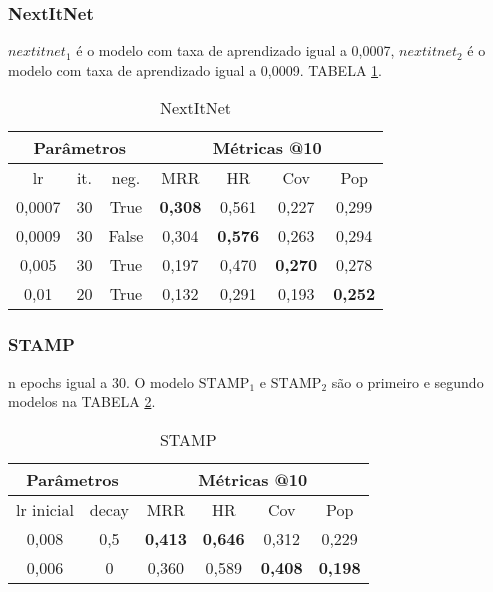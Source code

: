 \subsubsection{NextItNet}
$nextitnet_1$ é o modelo com taxa de aprendizado igual a 0,0007, $nextitnet_2$ é
o modelo com taxa de aprendizado igual a 0,0009. TABELA \ref{app:nextitnet2}.
\begin{table}
  \centering
  \begin{tabular}{|c|c|c|c|c|c|c|}
    \hline
      \multicolumn{3}{|c|}{Parâmetros} & \multicolumn{4}{c|}{Métricas @10} \\
      \hline
      lr & it. & neg. & MRR & HR & Cov & Pop \\
      \hline
      0,0007 & 30 & True & \textbf{0,308} & 0,561 & 0,227 & 0,299 \\
      \hline
      0,0009 & 30 & False & 0,304 & \textbf{0,576} & 0,263 & 0,294 \\
      \hline
      0,005 & 30 & True & 0,197 & 0,470 & \textbf{0,270} & 0,278 \\
      \hline
      0,01 & 20 & True & 0,132 & 0,291 & 0,193 & \textbf{0,252} \\
      \hline
    \end{tabular} \label{app:nextitnet2}
    \caption{NextItNet}
\end{table}

\subsubsection{STAMP}
n epochs igual a 30. O modelo $\text{STAMP}_{1}$ e $\text{STAMP}_{2}$
são o primeiro e segundo modelos na TABELA \ref{app:stamp2}.

\begin{table}
  \centering
  \begin{tabular}{|c|c|c|c|c|c|}
    \hline
      \multicolumn{2}{|c|}{Parâmetros} & \multicolumn{4}{c|}{Métricas @10} \\
      \hline
      lr inicial & decay & MRR & HR & Cov & Pop \\
      \hline
      0,008 & 0,5 & \textbf{0,413} & \textbf{0,646} & 0,312 & 0,229 \\
      \hline
      0,006 & 0 & 0,360 & 0,589 & \textbf{0,408} & \textbf{0,198} \\
      \hline
    \end{tabular} \label{app:stamp2}
    \caption{STAMP}
\end{table}


